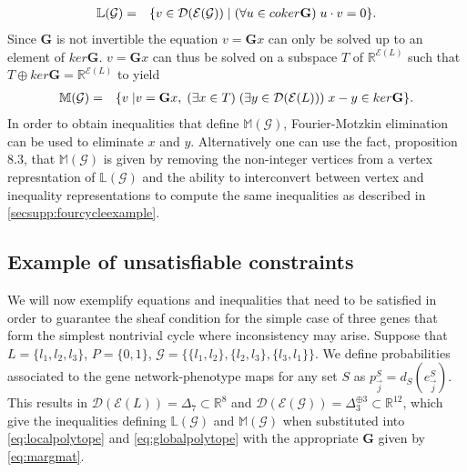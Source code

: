 \begin{eqnarray}\label{eq:localpolytope}
\mathbb{L}(\mathcal{G}) &=& \{ v \in \mathcal{D}{}(\mathcal{E}{}(\mathcal{G})) \; | \; (\forall u \in coker \mathbf{G}) \; u \cdot v = 0\}.
\end{eqnarray}
Since $\mathbf{G}$ is not invertible the equation $v = \mathbf{G}x$ can only be solved up to an element of $ker \mathbf{G}$. $v = \mathbf{G}x$ can thus be solved on a subspace $T$ of $\mathbb{R}^{\mathcal{E}(L)}$ such that $T \oplus ker \mathbf{G} = \mathbb{R}^{\mathcal{E}(L)}$ to yield
\begin{eqnarray}\label{eq:globalpolytope}
\mathbb{M}(\mathcal{G}) &=& \{ v \; | v = \mathbf{G} x,\; (\exists x \in T) \; (\exists y \in \mathcal{D}{}(\mathcal{E}{}(L)))\; x-y \in ker \mathbf{G}  \}.
\end{eqnarray}
In order to obtain inequalities that define $\mathbb{M}(\mathcal{G})$, Fourier-Motzkin elimination can be used to eliminate $x$ and $y$. Alternatively one can use the fact, \cite{Wainwright2007} proposition 8.3, that $\mathbb{M}(\mathcal{G})$ is given by removing the non-integer vertices from a vertex represntation of $\mathbb{L}(\mathcal{G})$ and the ability to interconvert between vertex and inequality representations to compute the same inequalities as described in  \ref{secsupp:fourcycleexample}.

\subsection{Example of unsatisfiable constraints}\label{sec:inconsistency}
We will now exemplify equations and inequalities that need to be satisfied in order to guarantee the sheaf condition for the simple case of three genes that form the simplest nontrivial cycle where inconsistency may arise. Suppose that $L = \{l_1,l_2,l_3\}$, $P = \{0,1\}$, $\mathcal{G} = \{\{l_1,l_2\},\{l_2,l_3\},\{l_3,l_1\}\}$. We define probabilities associated to the gene network-phenotype maps for any set $S$ as $p^S_{\vec{j}}= d_{S}(e^S_{\vec{j}})$. This results in $\mathcal{D}(\mathcal{E}(L)) = \Delta_7 \subset \mathbb{R}^8 $ and $\mathcal{D}(\mathcal{E}(\mathcal{G})) = \Delta^{\oplus 3}_3 \subset \mathbb{R}^{12}$,
which give the inequalities defining $\mathbb{L}(\mathcal{G})$ and $\mathbb{M}(\mathcal{G})$ when substituted into \ref{eq:localpolytope} and \ref{eq:globalpolytope} with the appropriate $\mathbf{G}$ given by \ref{eq:margmat}.

